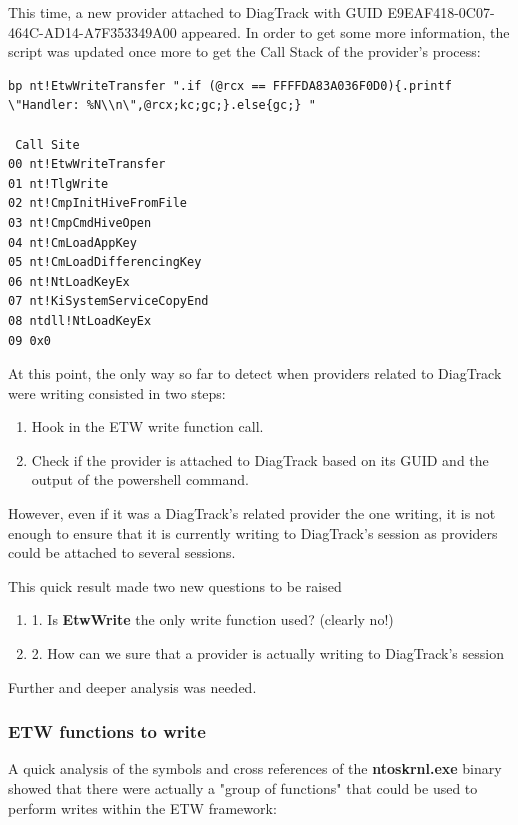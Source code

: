 This time, a new provider attached to DiagTrack with GUID E9EAF418-0C07-464C-AD14-A7F353349A00 appeared. In order to get some more information, the script was updated once more to get the Call Stack of the provider's process:
\begin{lstlisting}
bp nt!EtwWriteTransfer ".if (@rcx == FFFFDA83A036F0D0){.printf \"Handler: %N\\n\",@rcx;kc;gc;}.else{gc;} "
 
 Call Site
00 nt!EtwWriteTransfer
01 nt!TlgWrite
02 nt!CmpInitHiveFromFile
03 nt!CmpCmdHiveOpen
04 nt!CmLoadAppKey
05 nt!CmLoadDifferencingKey
06 nt!NtLoadKeyEx
07 nt!KiSystemServiceCopyEnd
08 ntdll!NtLoadKeyEx
09 0x0
\end{lstlisting}

At this point, the only way so far to detect when providers related to DiagTrack were writing consisted in two steps: 
\begin{enumerate}
\setlength\itemsep{0.05em}
\item Hook in the ETW write function call.
\item Check if the provider is attached to DiagTrack based on its GUID and the output of the powershell command.
\end{enumerate}

However, even if it was a DiagTrack's related provider the one writing, it is not enough to ensure that it is currently writing to DiagTrack's session as providers could be attached to several sessions.

This quick result made two new questions to be raised
\begin{enumerate}
\setlength\itemsep{0.05em}
  \item 1. Is {\bfseries EtwWrite} the only write function used? (clearly no!)
  \item 2. How can we sure that a provider is actually writing to DiagTrack's session
\end{enumerate}

Further and deeper analysis was needed.

\subsubsection{\bfseries{ETW functions to write}}

A quick analysis of the symbols and cross references of the {\bfseries ntoskrnl.exe} binary showed that there were actually a "group of functions" that could be used to perform writes within the ETW framework:

